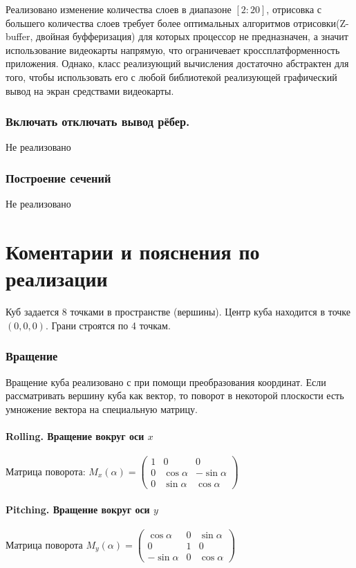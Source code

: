 \documentclass[a4paper,11pt]{article}
\begin{document}
      Реализовано изменение количества слоев в диапазоне $[2:20]$, отрисовка с большего количества слоев требует более оптимальных алгоритмов отрисовки(Z-buffer, двойная буфферизация) для которых процессор не предназначен, а значит использование видеокарты напрямую, что ограничевает \linebreak
      кроссплатформенность приложения. Однако, класс реализующий вычисления достаточно абстрактен для того, чтобы использовать его с любой библиотекой реализующей графический вывод на экран средствами видеокарты. 
    \section*{Включать отключать вывод рёбер.  }
    Не реализовано
    \section* {Построение сечений}
    Не реализовано
         
        
  
  
 
  \newpage
  \part{Коментарии и пояснения по реализации}
  Куб задается 8 точками в пространстве (вершины). Центр куба находится в точке $(0,0,0)$. Грани строятся по 4 точкам.
  \section{Вращение}
  Вращение куба реализовано с при помощи преобразования координат. Если рассматривать вершину куба как вектор, то поворот в некоторой плоскости есть умножение вектора на специальную матрицу.
  
  \subsection*{Rolling. Вращение вокруг оси $x$}
  Матрица поворота: $M_x(\alpha) =
  \begin{pmatrix}    
1 &   0           & 0           \\
0 & \cos \alpha   &  -\sin \alpha \\
0 & \sin \alpha & \cos \alpha 
 \end{pmatrix}$
 
  \subsection*{Pitching. Вращение вокруг оси $y$}
Матрица поворота  $M_y(\alpha) = 
\begin{pmatrix} 
\cos \alpha   & 0 & \sin \alpha \\
   0          & 1 &  0          \\
 -\sin \alpha & 0 & \cos \alpha
\end{pmatrix} $
\end{document}
